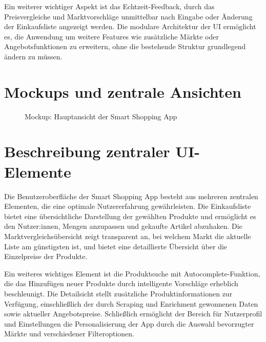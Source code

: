 \documentclass[12pt, a4paper]{report} %
\begin{document}
Ein weiterer wichtiger Aspekt ist das Echtzeit-Feedback, durch das Preisvergleiche und Marktvorschläge unmittelbar nach Eingabe oder Änderung der Einkaufsliste angezeigt werden. Die modulare Architektur der UI ermöglicht es, die Anwendung um weitere Features wie zusätzliche Märkte oder Angebotsfunktionen zu erweitern, ohne die bestehende Struktur grundlegend ändern zu müssen.

\section{Mockups und zentrale Ansichten}
\begin{figure}[h!]
    \centering
    \caption{Mockup: Hauptansicht der Smart Shopping App}
    \label{fig:ui_mockup}
\end{figure}

\section{Beschreibung zentraler UI-Elemente}
Die Benutzeroberfläche der Smart Shopping App besteht aus mehreren zentralen Elementen, die eine optimale Nutzererfahrung gewährleisten. Die Einkaufsliste bietet eine übersichtliche Darstellung der gewählten Produkte und ermöglicht es den Nutzer:innen, Mengen anzupassen und gekaufte Artikel abzuhaken. Die Marktvergleichsübersicht zeigt transparent an, bei welchem Markt die aktuelle Liste am günstigsten ist, und bietet eine detaillierte Übersicht über die Einzelpreise der Produkte.

Ein weiteres wichtiges Element ist die Produktsuche mit Autocomplete-Funktion, die das Hinzufügen neuer Produkte durch intelligente Vorschläge erheblich beschleunigt. Die Detailsicht stellt zusätzliche Produktinformationen zur Verfügung, einschließlich der durch Scraping und Enrichment gewonnenen Daten sowie aktueller Angebotspreise. Schließlich ermöglicht der Bereich für Nutzerprofil und Einstellungen die Personalisierung der App durch die Auswahl bevorzugter Märkte und verschiedener Filteroptionen.
\end{document}
